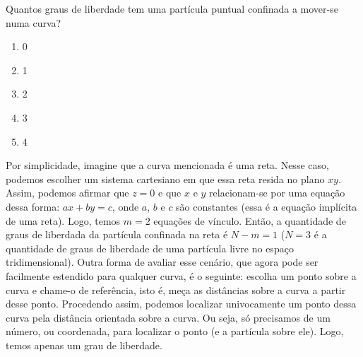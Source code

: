 \begin{question}
    Quantos graus de liberdade tem uma partícula puntual confinada a mover-se numa curva?
    \begin{enumerate}
      \item 0
      \item 1 \rightanswer
      \item 2
      \item 3
      \item 4
    \end{enumerate}

    \begin{solution}
      Por simplicidade, imagine que a curva mencionada é uma reta.
      Nesse caso, podemos escolher um sistema cartesiano em que essa reta resida no plano $xy$.
      Assim, podemos afirmar que $z = 0$ e que $x$ e $y$ relacionam-se por uma equação dessa forma: $ax + by = c$, onde $a$, $b$ e $c$ são constantes (essa é a equação implícita de uma reta).
      Logo, temos $m = 2$ equações de vínculo.
      Então, a quantidade de graus de liberdada da partícula confinada na reta é $N - m = 1$ ($N = 3$ é a quantidade de graus de liberdade de uma partícula livre no espaço tridimensional).
      Outra forma de avaliar esse cenário, que agora pode ser facilmente estendido para qualquer curva, é o seguinte: escolha um ponto sobre a curva e chame-o de referência, isto é, meça as distâncias sobre a curva a partir desse ponto.
      Procedendo assim, podemos localizar univocamente um ponto dessa curva pela distância orientada sobre a curva.
      Ou seja, só precisamos de um número, ou coordenada, para localizar o ponto (e a partícula sobre ele).
      Logo, temos apenas um grau de liberdade.
    \end{solution}
\end{question}